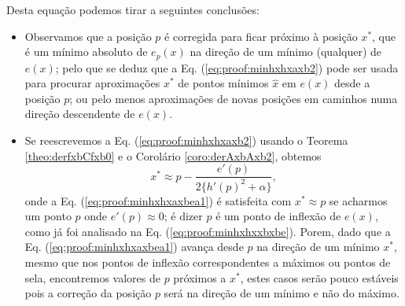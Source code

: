 \begin{myproofT}
Desta equação podemos tirar a seguintes conclusões:


\begin{itemize}

\item Observamos que a posição $p$ é corregida para ficar próximo à posição $x^*$, 
que é um mínimo absoluto de $e_p(x)$ na direção de um mínimo (qualquer) de $e(x)$;
pelo que se deduz que a Eq. (\ref{eq:proof:minhxhxaxb2})
pode ser usada para procurar aproximações $x^*$ de pontos mínimos $\hat{x}$ em $e(x)$ desde a posição $p$;
ou pelo menos aproximações de novas posições em caminhos numa direção descendente de $e(x)$.

\item Se reescrevemos a Eq. (\ref{eq:proof:minhxhxaxb2}) usando o Teorema \ref{theo:derfxbCfxb0}
e o Corolário \ref{coro:derAxbAxb2},
obtemos
\begin{equation}\label{eq:proof:minhxhxaxbea1}
x^* \approx p -
\frac{ e'(p)}{2 \{h'(p)^2+\alpha\} },
\end{equation}
onde a Eq. (\ref{eq:proof:minhxhxaxbea1}) é satisfeita 
com $x^* \approx p$
se acharmos um  ponto $p$ onde  
$e'(p)\approx 0$; 
é dizer $p$ é um ponto de inflexão de $e(x)$, como já foi analisado na Eq. (\ref{eq:proof:minhxhxxbxbe}).
Porem, dado que a Eq. (\ref{eq:proof:minhxhxaxbea1}) avança desde $p$ na direção de um mínimo $x^*$, 
mesmo que nos pontos de inflexão correspondentes a máximos ou pontos de sela,
encontremos valores de $p$ próximos a $x^*$,
 estes casos serão pouco estáveis pois
a correção da posição $p$ será na direção de um mínimo e não do máximo.


\end{itemize}
\end{myproofT}
